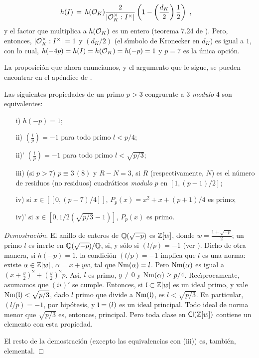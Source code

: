 \begin{align*}
 h(I) & \,=\,h(\cal{O}_{K})\frac{2}{|\cal{O}_{K}^{\times}:I^{\times}|}
 \left(1-\left(\frac{d_{K}}{2}\right)\frac{1}{2}\right)\text{ ,}
\end{align*}
y el factor que multiplica a $h(\cal{O}_{K})$ es un entero
(teorema 7.24 de \cite{cox}). Pero, entonces,
$|\cal{O}_{K}^{\times}:I^{\times}|=1$ y $(d_{K}/2)$
(el s\'{\i}mbolo de Kronecker en $d_{K}$) es igual a $1$, con lo cual,
$h(-4p)=h(I)=h(\cal{O}_{K})=h(-p)=1$ y $p=7$ es la \'{u}nica opci\'{o}n.
%

La proposici\'{o}n que ahora enunciamos, y el argumento que le sigue, se pueden
encontrar en el ap\'{e}ndice de \cite{serre}.

\begin{propoEquivsNumClasUno}\label{thm:propoEquivsNumClasUno}
Las siguientes propiedades de un primo $p>3$ congruente a $3$
\textit{modulo} $4$ son equivalentes:

\begin{itemize}
\item[i)] $h(-p)=1$;
\item[ii)] $\left( \frac{l}{p} \right)=-1$ para todo primo $l<p/4$;
\item[ii)'] $\left( \frac{l}{p} \right)=-1$ para todo primo $l<\sqrt{p/3}$;
\item[iii)] (si $p>7$) $p\equiv 3\,(8)$ y $R-N=3$, si $R$ (respectivamente, $N$)
es el n\'{u}mero de residuos (no residuos) cuadr\'{a}ticos \textit{modulo} $p$ en
$[1,(p-1)/2]$;
\item[iv)] si $x\in[\![ 0,(p-7)/4 ]\!]$, $P_{p}(x)=x^{2}+x+(p+1)/4$ es primo;
\item[iv)'] si $x\in[0,1/2(\sqrt{p/3}-1)]$, $P_{p}(x)$ es primo.
\end{itemize}
\end{propoEquivsNumClasUno}

\begin{proof}[Demostraci\'{o}n]
El anillo de enteros de $\bb{Q}(\sqrt{-p})$ es $\bb{Z}[w]$, donde
$w=\frac{1+\sqrt{-p}}{2}$; un primo $l$ es inerte en $\bb{Q}(\sqrt{-p})/\bb{Q}$,
si, y s\'{o}lo si $(l/p)=-1$ (ver \cite{cox}). Dicho de otra manera, si $h(-p)=1$,
la condici\'{o}n $(l/p)=-1$ implica que $l$ es una norma: existe
$\alpha\in\bb{Z}[w]$, $\alpha=x+yw$, tal que $\Nm(\alpha)=l$. Pero $\Nm(\alpha)$
es igual a $(x+\frac{y}{2})^{2}+(\frac{y}{2})^{2}p$. As\'{\i}, $l$ es primo,
$y\not =0$ y $\Nm(\alpha)\geq p/4$. Rec\'{\i}procamente, asumamos que $(ii)'$ se
cumple. Entonces, si $\frak{l}\subset\bb{Z}[w]$ es un ideal primo, y vale
$\Nm(\frak{l})<\sqrt{p/3}$, dado $l$ primo que divide a $\Nm(\frak{l})$, es
$l<\sqrt{p/3}$. En particular, $(l/p)=-1$, por hip\'{o}tesis, y $\frak{l}=(l)$ es
un ideal principal. Todo ideal de norma menor que $\sqrt{p/3}$ es, entonces,
principal. Pero toda clase en $\Cl(\bb{Z}[w])$ contiene un elemento con esta
propiedad.

El resto de la demostraci\'{o}n (excepto las equivalencias con (iii)) es,
tambi\'{e}n, elemental.
\end{proof}

